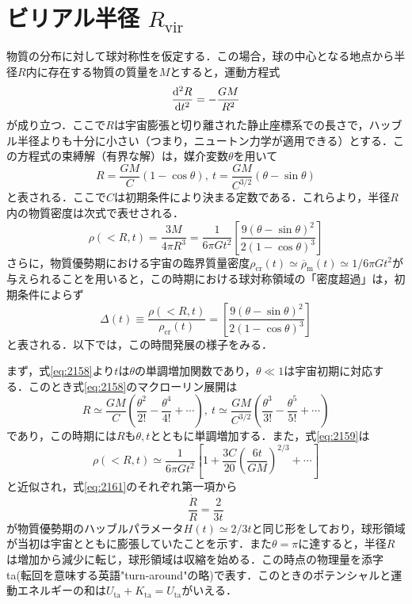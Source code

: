 \section{ビリアル半径 $R_\text{vir}$}

物質の分布に対して球対称性を仮定する．この場合，球の中心となる地点から半径$R$内に存在する物質の質量を$M$とすると，運動方程式
\begin{equation}
	\dv[2]{R}{t} = - \frac{GM}{R^2}
\end{equation}
が成り立つ．ここで$R$は宇宙膨張と切り離された静止座標系での長さで，ハッブル半径よりも十分に小さい（つまり，ニュートン力学が適用できる）とする．この方程式の束縛解（有界な解）は，媒介変数$\theta$を用いて
\begin{equation}
	R=\frac{GM}{C}(1-\cos\theta),\ t = \frac{GM}{C^{3/2}}(\theta - \sin\theta) \label{eq:2158}
\end{equation}
と表される．ここで$C$は初期条件により決まる定数である．これらより，半径$R$内の物質密度は次式で表せされる．
\begin{equation}
	\rho(<R,t) = \frac{3M}{4\pi R^3} = \frac{1}{6\pi Gt^2} \left[ \frac{9(\theta - \sin\theta)^2}{2(1-\cos\theta)^3} \right] \label{eq:2159}
\end{equation}
さらに，物質優勢期における宇宙の臨界質量密度$ \rho_\text{cr}(t) \simeq \overline{\rho}_\text{m}(t) \simeq 1/{6\pi Gt^2}$が与えられることを用いると，この時期における球対称領域の「密度超過」は，初期条件によらず
\begin{equation}
	\Delta(t) \equiv \frac{\rho(<R,t)}{\rho_\text{cr}(t)} = \left[\frac{9(\theta - \sin\theta)^2}{2(1-\cos\theta)^3}\right]
\end{equation}
と表される．以下では，この時間発展の様子をみる．

まず，式\eqref{eq:2158}より$t$は$\theta$の単調増加関数であり，$\theta \ll 1$は宇宙初期に対応する．このとき式\eqref{eq:2158}のマクローリン展開は
\begin{equation}
	R \simeq \frac{GM}{C} \left( \frac{\theta^2}{2!} - \frac{\theta^4}{4!} + \cdots \right), \ t \simeq \frac{GM}{C^{3/2}} \left( \frac{\theta^3}{3!} - \frac{\theta^5}{5!} + \cdots \right)
\end{equation}
であり，この時期には$R$も$\theta,t$とともに単調増加する．また，式\eqref{eq:2159}は
\begin{equation}
	\rho(<R, t) \simeq \frac{1}{6 \pi G t^2} \left[ 1 + \frac{3C}{20}\left( \frac{6t}{GM} \right)^{2/3} + \cdots \right] \label{eq:2161}
\end{equation}
と近似され，式\eqref{eq:2161}のそれぞれ第一項から
\begin{equation}
	\frac{\dot{R}}{R} = \frac{2}{3t}
\end{equation}
が物質優勢期のハッブルパラメータ$H(t) \simeq 2/3t$と同じ形をしており，球形領域が当初は宇宙とともに膨張していたことを示す．また$\theta = \pi$に達すると，半径$R$は増加から減少に転じ，球形領域は収縮を始める．この時点の物理量を添字ta(転回を意味する英語"turn-around"の略)で表す．このときのポテンシャルと運動エネルギーの和は$U_\text{ta}+K_\text{ta} = U_\text{ta}$がいえる．



